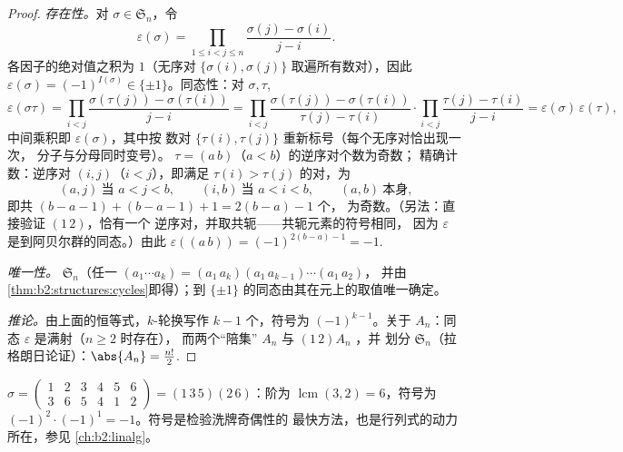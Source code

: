 \begin{proof}
\emph{存在性。}对 $\sigma \in \mathfrak{S}_n$，令
\[
\varepsilon(\sigma)
= \prod_{1 \leq i < j \leq n}
\frac{\sigma(j) - \sigma(i)}{j - i} .
\]
各因子的绝对值之积为 $1$（无序对
$\{\sigma(i), \sigma(j)\}$ 取遍所有数对），因此
$\varepsilon(\sigma) = (-1)^{I(\sigma)} \in \{\pm1\}$。同态性：对
$\sigma, \tau$,
\[
\varepsilon(\sigma\tau)
= \prod_{i<j} \frac{\sigma(\tau(j)) - \sigma(\tau(i))}{j - i}
= \prod_{i<j} \frac{\sigma(\tau(j)) - \sigma(\tau(i))}{\tau(j) -
\tau(i)} \cdot \prod_{i<j} \frac{\tau(j) - \tau(i)}{j - i}
= \varepsilon(\sigma)\,\varepsilon(\tau),
\]
中间乘积即 $\varepsilon(\sigma)$，其中按
数对 $\{\tau(i), \tau(j)\}$ 重新标号（每个无序对恰出现一次，
分子与分母同时变号）。
$\tau = (a\,b)$（$a < b$）的逆序对个数为奇数；
精确计数：逆序对 $(i, j)$（$i < j$），即满足
$\tau(i) > \tau(j)$ 的对，为
\[
(a, j) \ \text{当 } a < j < b, \qquad
(i, b) \ \text{当 } a < i < b, \qquad
(a, b) \ \text{本身},
\]
即共 $(b - a - 1) + (b - a - 1) + 1 = 2(b - a) - 1$ 个，
为奇数。（另法：直接验证 $(1\,2)$，恰有一个
逆序对，并取共轭——共轭元素的符号相同，
因为 $\varepsilon$ 是到阿贝尔群的同态。）由此
$\varepsilon((a\,b)) = (-1)^{2(b-a)-1} = -1$.

\emph{唯一性。} $\mathfrak{S}_n$（任一
 $(a_1\cdots a_k) = (a_1\,a_k)(a_1\,a_{k-1})\cdots(a_1\,a_2)$，
并由\cref{thm:b2:structures:cycles}即得）；到
$\{\pm1\}$ 的同态由其在元上的取值唯一确定。

\emph{推论。}由上面的恒等式，$k$-轮换写作
$k - 1$ 个，符号为 $(-1)^{k-1}$。关于 $A_n$：同态
$\varepsilon$ 是满射（$n \geq 2$ 时存在），
而两个“陪集” $A_n$ 与 $(1\,2)A_n$ ，并
划分 $\mathfrak{S}_n$（拉格朗日论证）：$\abs{A_n} =
\frac{n!}{2}$.
\end{proof}

\begin{example}\label{ex:b2:structures:snexample}
$\sigma = \begin{pmatrix} 1&2&3&4&5&6\\ 3&6&5&4&1&2 \end{pmatrix}
= (1\,3\,5)(2\,6)$：阶为 $\operatorname{lcm}(3,2) = 6$，符号为
$(-1)^{2}\cdot(-1)^{1} = -1$。符号是检验洗牌奇偶性的
最快方法，也是行列式的动力所在，参见
\cref{ch:b2:linalg}。
\end{example}

